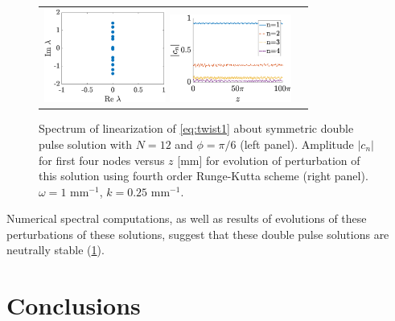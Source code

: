 \documentclass[reprint, amsmath,amssymb,aps,pra]{revtex4-2}
\begin{document}
\begin{figure}
\begin{center}
\begin{tabular}{cc}
\includegraphics[width=4cm]{dp12pi6spec.eps}
\includegraphics[width=4cm]{dp12pi6pert.eps}
\end{tabular}
\end{center}
\caption{Spectrum of linearization of \cref{eq:twist1} about symmetric double pulse solution with $N=12$ and $\phi = \pi/6$ (left panel). Amplitude $|c_n|$ for first four nodes versus $z$ [mm] for evolution of perturbation of this solution using fourth order Runge-Kutta scheme (right panel). $\omega = 1\text{ mm}^{-1}$, $k=0.25\text{ mm}^{-1}$.}
\label{fig:dpstab}
\end{figure}

Numerical spectral computations, as well as results of evolutions of these perturbations of these solutions, suggest that these double pulse solutions are neutrally stable (\cref{fig:dpstab}).

\section{Conclusions}
\end{document}
